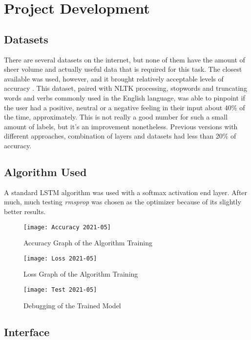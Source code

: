\chapter{Project Development}

\section{Datasets}
There are several datasets on the internet, but none of them have the amount of sheer volume and actually useful data that is required for this task. The closest available was used, however, and it brought relatively acceptable levels of accuracy \citep{rf7}.
This dataset, paired with NLTK processing, stopwords and truncating words and verbs commonly used in the English language, was able to pinpoint if the user had a positive, neutral or a negative feeling in their input about 40\% of the time, approximately.
This is not really a good number for such a small amount of labels, but it's an improvement nonetheless. Previous versions with different approaches, combination of layers and datasets had less than 20\% of accuracy.

\section{Algorithm Used}
A standard LSTM algorithm was used with a softmax activation end layer. After much, much testing \textit{rmsprop} was chosen as the optimizer because of its slightly better results.
\begin{figure}[h]
	\centering
	\texttt{[image: Accuracy 2021-05]}
	\caption{Accuracy Graph of the Algorithm Training}
	\label{fig:accuracy}
\end{figure}
\begin{figure}[h]
	\centering
	\texttt{[image: Loss 2021-05]}
	\caption{Loss Graph of the Algorithm Training}
	\label{fig:loss}
\end{figure}
\begin{figure}[h]
	\centering
	\texttt{[image: Test 2021-05]}
	\caption{Debugging of the Trained Model}
	\label{fig:test}
\end{figure}

\section{Interface}

